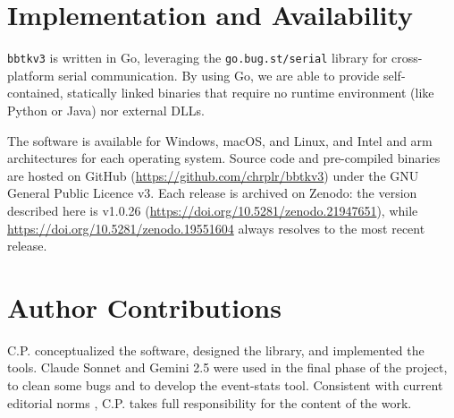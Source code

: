 \documentclass[jou,a4paper]{apa7}
\begin{document}
\section{Implementation and Availability}
\label{sec:availability}

\texttt{bbtkv3} is written in Go, leveraging the
\texttt{go.bug.st/serial} library for cross-platform serial
communication. By using Go, we are able to provide self-contained,
statically linked binaries that require no runtime environment (like
Python or Java) nor external DLLs.

The software is available for Windows, macOS, and Linux, and Intel and
arm architectures for each operating system. Source code and
pre-compiled binaries are hosted on GitHub
(\url{https://github.com/chrplr/bbtkv3}) under the GNU General Public
Licence v3. Each release is archived on Zenodo: the version described
here is v1.0.26 (\url{https://doi.org/10.5281/zenodo.21947651}), while
\url{https://doi.org/10.5281/zenodo.19551604} always resolves to the
most recent release.

\section*{Author Contributions}

C.P. conceptualized the software, designed the library, and
implemented the tools. Claude Sonnet and Gemini 2.5 were used in the
final phase of the project, to clean some bugs and to develop the
event-stats tool. Consistent with current editorial norms
\parencite{springernature2023}, C.P. takes full responsibility for the
content of the work.

\printbibliography
\end{document}
